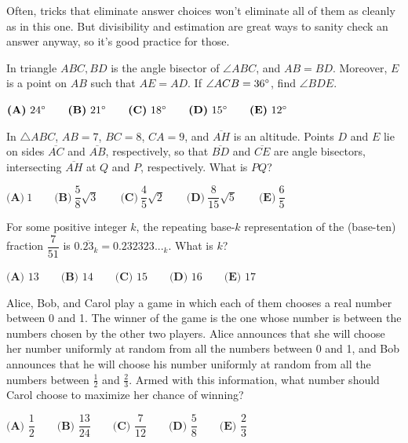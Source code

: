 \documentclass[11pt,paper=letter]{scrartcl}
\begin{document}
Often, tricks that eliminate answer choices won't eliminate all of them as cleanly as in this one. But divisibility and estimation are great ways to sanity check an answer anyway, so it's good practice for those.

\begin{mdframed}[style=exmdbox]

\begin{problem}
  In triangle $ABC, BD$ is the angle bisector of $\angle ABC$, and $AB = BD$. Moreover, $E$ is a point on $AB$ such that $AE = AD$. If $\angle ACB = 36^\circ$, find $\angle BDE$.

\vspace{6pt} \noindent $\textbf{(A)}\ 24^\circ \qquad
\textbf{(B)}\ 21^\circ \qquad
\textbf{(C)}\ 18^\circ \qquad
\textbf{(D)}\ 15^\circ \qquad
\textbf{(E)}\ 12^\circ$
\end{problem}

\begin{problem}[AMC 12B 2016/17]
  In $\triangle ABC$, $AB=7$, $BC=8$, $CA=9$, and $\overline{AH}$ is an altitude. Points $D$ and $E$ lie on sides $\overline{AC}$ and $\overline{AB}$, respectively, so that $\overline{BD}$ and $\overline{CE}$ are angle bisectors, intersecting $\overline{AH}$ at $Q$ and $P$, respectively. What is $PQ$?

\vspace{6pt} \noindent $\textbf{(A)}\ 1 \qquad
\textbf{(B)}\ \dfrac{5}{8}\sqrt{3} \qquad
\textbf{(C)}\ \dfrac{4}{5}\sqrt{2} \qquad
\textbf{(D)}\ \dfrac{8}{15}\sqrt{5} \qquad
\textbf{(E)}\ \dfrac{6}{5}$

\end{problem}

\begin{problem}[AMC 10A 2019/18]
  For some positive integer $k$, the repeating base-$k$ representation of the (base-ten) fraction $\dfrac{7}{51}$ is $0.\overline{23}_k = 0.232323..._k$. What is $k$?

  \vspace{6pt} \noindent $\textbf{(A) } 13 \qquad\textbf{(B) } 14 \qquad\textbf{(C) } 15 \qquad\textbf{(D) } 16 \qquad\textbf{(E) } 17$
\end{problem}

\begin{problem}[AMC 12A 2018/24]
  Alice, Bob, and Carol play a game in which each of them chooses a real number between 0 and 1. The winner of the game is the one whose number is between the numbers chosen by the other two players. Alice announces that she will choose her number uniformly at random from all the numbers between 0 and 1, and Bob announces that he will choose his number uniformly at random from all the numbers between $\frac{1}{2}$ and $\frac{2}{3}.$ Armed with this information, what number should Carol choose to maximize her chance of winning?

  \vspace{6pt} \noindent $
  \textbf{(A) }\dfrac{1}{2}\qquad
  \textbf{(B) }\dfrac{13}{24} \qquad
  \textbf{(C) }\dfrac{7}{12} \qquad
  \textbf{(D) }\dfrac{5}{8} \qquad
  \textbf{(E) }\dfrac{2}{3}\qquad
  $
\end{problem}

\end{mdframed}
\end{document}

